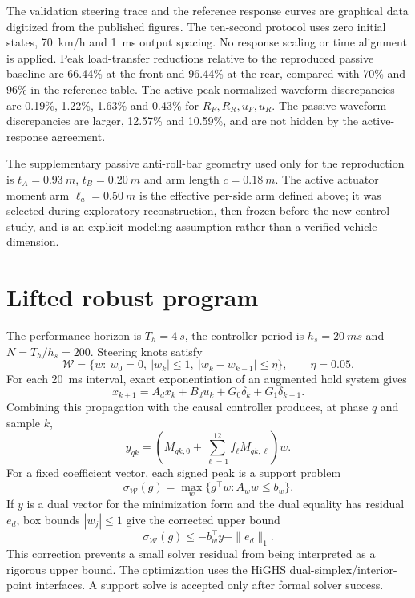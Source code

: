 \documentclass[10pt,a4paper]{article}
\newcommand{\W}{\mathcal{W}}
\begin{document}
The validation steering trace and the reference response curves are graphical data digitized from the published figures. The ten-second protocol uses zero initial states, \SI{70}{km/h} and \SI{1}{ms} output spacing. No response scaling or time alignment is applied. Peak load-transfer reductions relative to the reproduced passive baseline are 66.44\% at the front and 96.44\% at the rear, compared with 70\% and 96\% in the reference table. The active peak-normalized waveform discrepancies are 0.19\%, 1.22\%, 1.63\% and 0.43\% for $R_F,R_R,u_F,u_R$. The passive waveform discrepancies are larger, 12.57\% and 10.59\%, and are not hidden by the active-response agreement.

The supplementary passive anti-roll-bar geometry used only for the reproduction is $t_A=\SI{0.93}{m}$, $t_B=\SI{0.20}{m}$ and arm length $c=\SI{0.18}{m}$. The active actuator moment arm $\ell_a=\SI{0.50}{m}$ is the effective per-side arm defined above; it was selected during exploratory reconstruction, then frozen before the new control study, and is an explicit modeling assumption rather than a verified vehicle dimension.

\section{Lifted robust program}

The performance horizon is $T_h=\SI{4}{s}$, the controller period is $h_s=\SI{20}{ms}$ and $N=T_h/h_s=200$. Steering knots satisfy
\begin{equation}
\W=\{w:\ w_0=0,\ |w_k|\le1,\ |w_k-w_{k-1}|\le\eta\},
\qquad \eta=0.05.
\end{equation}
For each \SI{20}{ms} interval, exact exponentiation of an augmented hold system gives
\begin{equation}
x_{k+1}=A_dx_k+B_du_k+G_0\delta_k+G_1\delta_{k+1}.
\end{equation}
Combining this propagation with the causal controller produces, at phase $q$ and sample $k$,
\begin{equation}
y_{qk}=\left(M_{qk,0}+\sum_{\ell=1}^{12}f_\ell M_{qk,\ell}\right)w.
\end{equation}
For a fixed coefficient vector, each signed peak is a support problem
\begin{equation}
\sigma_\W(g)=\max_w\{g^\top w:A_ww\le b_w\}.
\end{equation}
If $y$ is a dual vector for the minimization form and the dual equality has residual $e_d$, box bounds $|w_j|\le1$ give the corrected upper bound
\begin{equation}
\sigma_\W(g)\le -b_w^\top y+\|e_d\|_1.
\end{equation}
This correction prevents a small solver residual from being interpreted as a rigorous upper bound. The optimization uses the HiGHS dual-simplex/interior-point interfaces. A support solve is accepted only after formal solver success.
\end{document}
